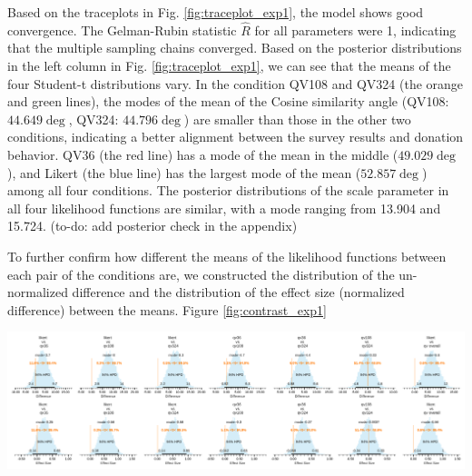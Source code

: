 Based on the traceplots in Fig. \ref{fig:traceplot_exp1}, the model shows good convergence. The Gelman-Rubin statistic $\hat{R}$ for all parameters were 1, indicating that the multiple sampling chains converged. Based on the posterior distributions in the left column in Fig. \ref{fig:traceplot_exp1}, we can see that the means of the four Student-t distributions vary. In the condition QV108 and QV324 (the orange and green lines), the modes of the mean of the Cosine similarity angle (QV108: $44.649 \deg$, QV324: $44.796 \deg$) are smaller than those in the other two conditions, indicating a better alignment between the survey results and donation behavior. QV36 (the red line) has a mode of the mean in the middle ($49.029 \deg$), and Likert (the blue line) has the largest mode of the mean ($52.857 \deg$) among all four conditions. The posterior distributions of the scale parameter in all four likelihood functions are similar, with a mode ranging from 13.904 and 15.724. (to-do: add posterior check in the appendix)

To further confirm how different the means of the likelihood functions between each pair of the conditions are, we constructed the distribution of the un-normalized difference and the distribution of the effect size (normalized difference) between the means. Figure \ref{fig:contrast_exp1}


\begin{landscape}[hbt]
    \centering
    \includegraphics[width=1.4\textwidth, keepaspectratio=true]{content/image/Votes_vs_Absolute_Donation_StudentT_differences_and_effects.pdf}
    \label{fig:contrast_exp1}
\end{landscape}
    
